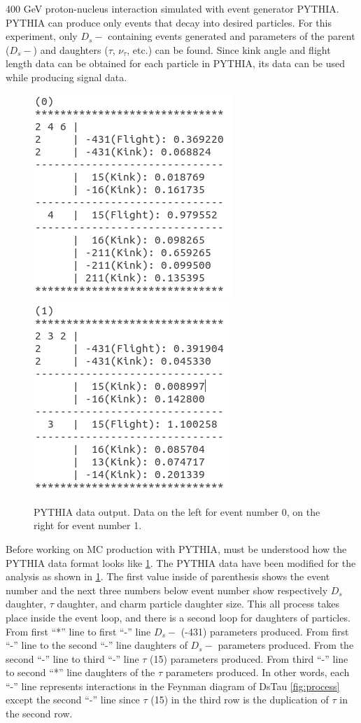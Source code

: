 \documentclass[12pt]{report}
\begin{document}
400 GeV proton-nucleus interaction simulated with event generator PYTHIA. PYTHIA can produce only events that decay into desired particles. For this experiment, only $D_s-$ containing events generated and parameters of the parent ($D_s-$) and daughters ($\tau$, $\nu_\tau$, etc.) can be found. Since kink angle and flight length data can be obtained for each particle in PYTHIA, its data can be used while producing signal data.

\begin{figure}[htp]
\centering
\includegraphics[width = 6 cm]{PythiaDataSS0.png}
\includegraphics[width = 6 cm]{PythiaDataSS1.png}
\caption{PYTHIA data output. Data on the left for event number 0, on the right for event number 1.}
\label{fig:PythiaData}
\end{figure}

Before working on MC production with PYTHIA, must be understood how the PYTHIA data format looks like \ref{fig:PythiaData}. The PYTHIA data have been modified for the analysis as shown in \ref{fig:PythiaData}. The first value inside of parenthesis shows the event number and the next three numbers below event number show respectively $D_s$ daughter, $\tau$ daughter, and charm particle daughter size. This all process takes place inside the event loop, and there is a second loop for daughters of particles. From first “*” line to first “-” line $D_s-$ (-431) parameters produced. From first “-” line to the second “-” line daughters of $D_s-$ parameters produced. From the second “-” line to third “-” line $\tau$ (15) parameters produced. From third “-” line to second “*” line daughters of the $\tau$ parameters produced. In other words, each “-” line represents interactions in the Feynman diagram of DsTau \ref{fig:process} except the second “-” line since $\tau$ (15) in the third row is the duplication of $\tau$ in the second row.
\end{document}
